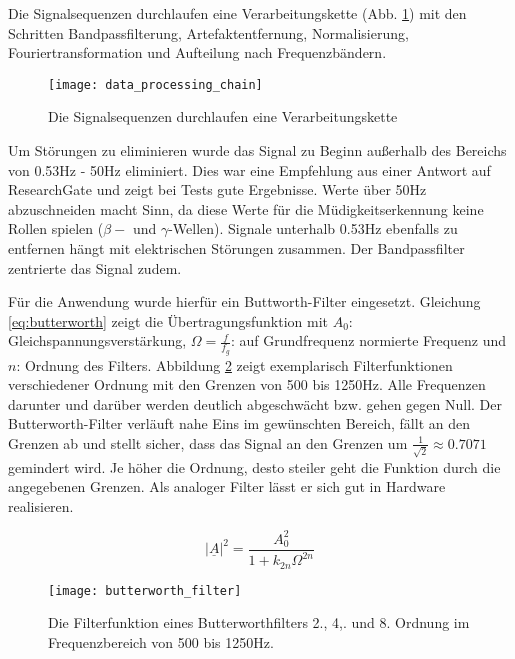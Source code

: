 \label{sec:processing}
Die Signalsequenzen durchlaufen eine Verarbeitungskette (Abb. \ref{fig:data_processing_chain}) mit den Schritten Bandpassfilterung, Artefaktentfernung, Normalisierung, Fouriertransformation und Aufteilung nach Frequenzbändern.

\begin{figure}[h] 
  \begin{center}
    \texttt{[image: data\_processing\_chain]}
    \caption[Verarbeitungskette]{Die Signalsequenzen durchlaufen eine Verarbeitungskette \label{fig:data_processing_chain}}
  \end{center}
\end{figure}

Um Störungen zu eliminieren wurde das Signal zu Beginn außerhalb des Bereichs von 0.53Hz - 50Hz eliminiert. Dies war eine Empfehlung aus einer Antwort auf ResearchGate \cite{resGate} und zeigt bei Tests gute Ergebnisse. Werte über 50Hz abzuschneiden macht Sinn, da diese Werte für die Müdigkeitserkennung keine Rollen spielen ($\beta-$ und $\gamma$-Wellen). Signale unterhalb 0.53Hz ebenfalls zu entfernen hängt mit elektrischen Störungen zusammen. Der Bandpassfilter zentrierte das Signal zudem. 

Für die Anwendung wurde hierfür ein Buttworth-Filter\cite{Butterworth30} eingesetzt. Gleichung \ref{eq:butterworth} zeigt die Übertragungsfunktion mit $A_0$: Gleichspannungsverstärkung, $\Omega = \frac{f}{f_g}$: auf Grundfrequenz normierte Frequenz und $n$: Ordnung des Filters. Abbildung \ref{fig:butterworth_filter} zeigt exemplarisch Filterfunktionen verschiedener Ordnung mit den Grenzen von 500 bis 1250Hz. Alle Frequenzen darunter und darüber werden deutlich abgeschwächt bzw. gehen gegen Null. Der Butterworth-Filter verläuft nahe Eins im gewünschten Bereich, fällt an den Grenzen ab und stellt sicher, dass das Signal an den Grenzen um $\frac{1}{\sqrt{2}} \approx 0.7071$ gemindert wird. Je höher die Ordnung, desto steiler geht die Funktion durch die angegebenen Grenzen. Als analoger Filter lässt er sich gut in Hardware realisieren.

\begin{equation} \label{eq:butterworth}
\left|\underline{A}\right|^2 = \frac{A_0^2}{1+ k_{2n} \Omega ^{2n}}
\end{equation}

\begin{figure}[h] 
  \begin{center}
    \texttt{[image: butterworth\_filter]}
    \caption[Butterworth-Filter]{Die Filterfunktion eines Butterworthfilters 2., 4,. und 8. Ordnung im Frequenzbereich von 500 bis 1250Hz. \label{fig:butterworth_filter}}
  \end{center}
\end{figure}

